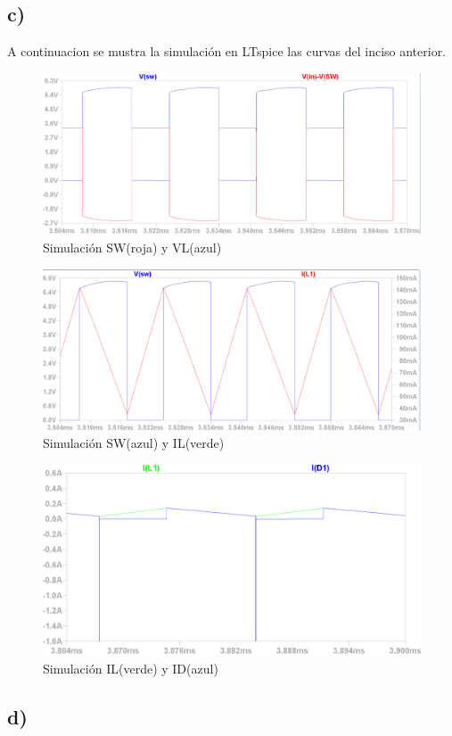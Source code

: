 \documentclass[e4_tp1_main.tex]{subfiles}
\begin{document}
\subsection*{c)}

A continuacion se mustra la simulaci\'on en LTspice las curvas del inciso anterior. 


\begin{figure}[H]
  \centering
    \includegraphics[scale = 0.6]{Imagenes/punto2/SW&VL}
  \caption{Simulaci\'on SW(roja) y VL(azul)}
  \label{fig:SW&VL}
\end{figure}

\begin{figure}[H]
  \centering
    \includegraphics[scale = 0.6]{Imagenes/punto2/SW&IL}
  \caption{Simulaci\'on SW(azul) y IL(verde)}
  \label{fig:SW&IL}
\end{figure}


\begin{figure}[H]
  \centering
    \includegraphics[scale = 0.52]{Imagenes/punto2/IL&ID}
  \caption{Simulaci\'on IL(verde) y ID(azul)}
  \label{fig:IL&ID}
\end{figure}


\subsection*{d)}





\newpage
\end{document}
